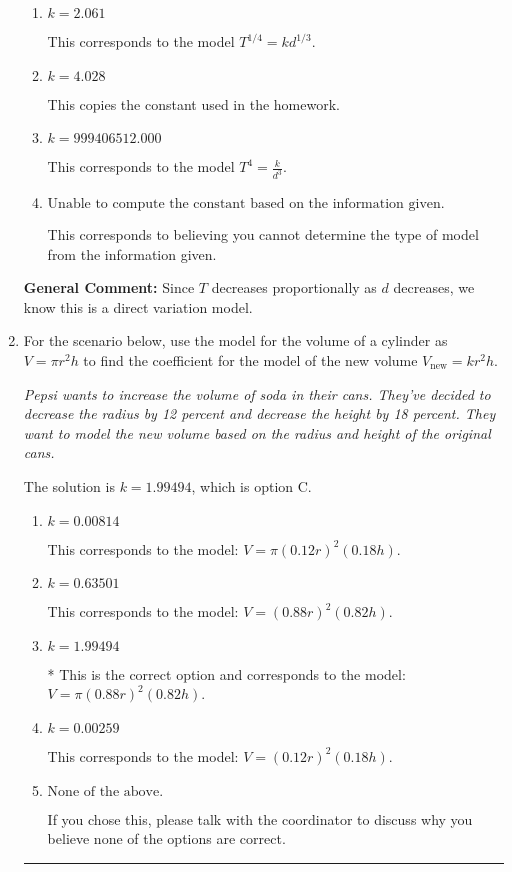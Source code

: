 \documentclass{extbook}[14pt]
\newcommand{\litem}[1]{\item #1

\rule{\textwidth}{0.4pt}}
\begin{document}
\begin{enumerate}
{\begin{enumerate}[label=\Alph*.]
* This is the correct option corresponding to the model $T^{4} = k d^{3}$.
\item \( k = 2.061 \)

This corresponds to the model $T^{1/4} = k d^{1/3}$.
\item \( k = 4.028 \)

This copies the constant used in the homework.
\item \( k = 999406512.000 \)

This corresponds to the model $T^{4} = \frac{k}{d^{3}}$.
\item \( \text{Unable to compute the constant based on the information given.} \)

This corresponds to believing you cannot determine the type of model from the information given.
\end{enumerate}

\textbf{General Comment:} Since $T$ decreases proportionally as $d$ decreases, we know this is a direct variation model.
}
\litem{
For the scenario below, use the model for the volume of a cylinder as $V = \pi r^2 h$ to find the coefficient for the model of the new volume $V_{\text{new}} = k r^2 h$.

\begin{center}
    \textit{ Pepsi wants to increase the volume of soda in their cans. They've decided to decrease the radius by 12 percent and decrease the height by 18 percent. They want to model the new volume based on the radius and height of the original cans. }
\end{center}
The solution is \( k = 1.99494 \), which is option C.\begin{enumerate}[label=\Alph*.]
\item \( k = 0.00814 \)

This corresponds to the model: $V = \pi (0.12 r)^2 (0.18 h)$.
\item \( k = 0.63501 \)

This corresponds to the model: $V = (0.88 r)^2 (0.82 h)$.
\item \( k = 1.99494 \)

* This is the correct option and corresponds to the model: $V = \pi (0.88 r)^2 (0.82 h)$.
\item \( k = 0.00259 \)

This corresponds to the model: $V = (0.12 r)^2 (0.18 h)$.
\item \( \text{None of the above.} \)

If you chose this, please talk with the coordinator to discuss why you believe none of the options are correct.
\end{enumerate}

}
\end{enumerate}
\end{document}
